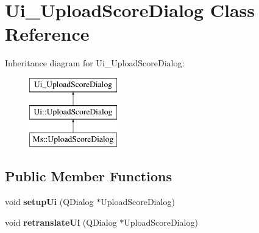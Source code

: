 \hypertarget{class_ui___upload_score_dialog}{}\section{Ui\+\_\+\+Upload\+Score\+Dialog Class Reference}
\label{class_ui___upload_score_dialog}
Inheritance diagram for Ui\+\_\+\+Upload\+Score\+Dialog\+:\begin{figure}[H]
\begin{center}
\leavevmode
\includegraphics[height=3.000000cm]{class_ui___upload_score_dialog}
\end{center}
\end{figure}
\subsection*{Public Member Functions}
\begin{DoxyCompactItemize}
\item 
\mbox{\label{class_ui___upload_score_dialog_a8cfbe529545d6f798258f1a2cdec839d}} 
void {\bfseries setup\+Ui} (Q\+Dialog $\ast$Upload\+Score\+Dialog)
\item 
\mbox{\label{class_ui___upload_score_dialog_afa3658757db4a5949d1535cf071662d4}} 
void {\bfseries retranslate\+Ui} (Q\+Dialog $\ast$Upload\+Score\+Dialog)
\end{DoxyCompactItemize}
